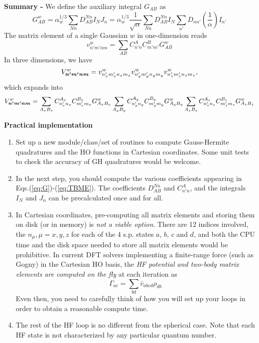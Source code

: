{\bf Summary - } We define the auxiliary integral $G_{AB}$ as
\begin{equation}
G_{AB}^{w}
= \alpha_{w}^{1/3}\sum_{Nn} D_{AB}^{Nn} I_{N} J_{n}
= \alpha_{w}^{1/3}\frac{1}{\sqrt{\alpha}} \sum_{Nn} D_{AB}^{Nn} I_{N} 
\sum_{n'} D_{nn'}\left( \frac{1}{\alpha} \right)  I_{n'}
\label{eq:G}
\end{equation}
The matrix element of a single Gaussian $w$ in one-dimension reads
\begin{equation}
v^{w}_{n'm'nm} = \sum_{AB} C_{n'n}^{A}C_{m'm'}^{B} G_{AB}^{w}
\end{equation}
In three dimensions, we have
\begin{equation}
V^{w}_{\boldsymbol{n'}\boldsymbol{m'}\boldsymbol{n}\boldsymbol{m}} = 
v^{w}_{n'_{x}m'_{x}n_{x}m_{x}}
v^{w}_{n'_{y}m'_{y}n_{y}m_{y}}
v^{w}_{n'_{z}m'_{z}n_{z}m_{z}},
\end{equation}
which expands into
\begin{equation}
V^{w}_{\boldsymbol{n'}\boldsymbol{m'}\boldsymbol{n}\boldsymbol{m}} 
=
\sum_{A_{x}B_{x}} C_{n'_{x}n_{x}}^{A_{x}}C_{m'_{x}m_{x}}^{B_{x}} G_{A_{x}B_{x}}^{w}
\sum_{A_{y}B_{y}} C_{n'_{y}n_{y}}^{A_{y}}C_{m'_{y}m_{y}}^{B_{y}} G_{A_{y}B_{y}}^{w}
\sum_{A_{z}B_{z}} C_{n'_{z}n_{z}}^{A_{z}}C_{m'_{z}m_{z}}^{B_{z}} G_{A_{z}B_{z}}^{w}
\label{eq:TBME}
\end{equation}

{\bf Practical implementation}
\begin{enumerate}
\item Set up a new module/class/set of routines to compute Gauss-Hermite 
quadratures and the HO functions in Cartesian coordinates. Some unit tests 
to check the accuracy of GH quadratures would be welcome.
\item In the next step, you should compute the various coefficients appearing 
in Eqs.(\ref{eq:G})-(\ref{eq:TBME}). The coefficients $D_{AB}^{Nn}$ and 
$C_{n'n}^{A}$, and the integrals $I_{N}$ and $J_{n}$ can be precalculated once 
and for all.
\item In Cartesian coordinates, pre-computing all matrix elements and storing 
them on disk (or in memory) is {\em not a viable option}. There are 12 indices 
involved, the $n_{\mu}, \mu = x, y,z $ for each of the 4 s.p. states $a$, $b$, 
$c$ and $d$, and both the CPU time and the disk space needed to store all 
matrix elements would be prohibitive. In current DFT solvers implementing a 
finite-range force (such as Gogny) in the Cartesian HO basis, the {\em HF 
potential and two-body matrix elements are computed on the fly} at each 
iteration as 
\begin{equation}
\Gamma_{ac} = \sum_{bd} \bar{v}_{abcd}\rho_{db}
\end{equation}
Even then, you need to carefully think of how you will set up your loops in 
order to obtain a reasonable compute time.
\item The rest of the HF loop is no different from the spherical case. Note 
that each HF state is not characterized by any particular quantum number.
\end{enumerate}


